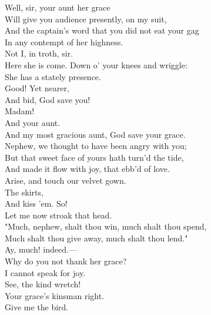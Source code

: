 \documentclass[a4paper,oneside]{memoir}
\begin{document}
\begin{drama*}
\subtlespeaks {} Well, sir, your aunt her grace\\
Will give you audience presently, on my suit,\\
And the captain's word that you did not eat your gag\\
In any contempt of her highness.\\
\dapperspeaks {} Not I, in troth, sir.\\
\subtlespeaks Here she is come. Down o' your knees and wriggle:\\
She has a stately presence.\\
Good! Yet nearer,\\
And bid, God save you!\\
\dapperspeaks {} Madam!\\
\subtlespeaks {} And your aunt.\\
\dapperspeaks And my most gracious aunt, God save your grace.\\
\dolspeaks Nephew, we thought to have been angry with you;\\
But that sweet face of yours hath turn'd the tide,\\
And made it flow with joy, that ebb'd of love.\\
Arise, and touch our velvet gown.\\
\subtlespeaks {} The skirts,\\
And kiss 'em. So!\\
\dolspeaks {} Let me now stroak that head.\\
"Much, nephew, shalt thou win, much shalt thou spend,\\
Much shalt thou give away, much shalt thou lend."\\
\subtlespeaks {} Ay, much! indeed.---\\
Why do you not thank her grace?\\
\dapperspeaks {} I cannot speak for joy.\\
\subtlespeaks See, the kind wretch!\\
Your grace's kinsman right.\\
\dolspeaks {} Give me the bird.\\

\end{drama*}
\end{document}
